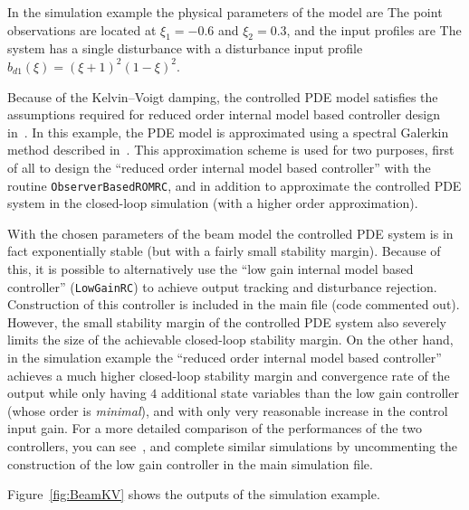 \documentclass[11pt, a4paper]{amsart}
\theoremstyle{definition}
\numberwithin{equation}{section}
\begin{document}
In the simulation example the physical parameters of the model are 
The point observations are located at $\xi_1=-0.6$ and $\xi_2=0.3$, and the input profiles are
The system has a
single disturbance with a disturbance input profile 
$b_{d1}(\xi) = (\xi+1)^2(1-\xi)^2$.


Because of the Kelvin--Voigt damping, the controlled PDE model satisfies the assumptions required for reduced order internal model based controller design in~\cite{PauPha20}.
In this example, the PDE model is approximated using a spectral Galerkin method described in~\cite{She95}. This approximation scheme is used for two purposes, first of all to design the ``reduced order internal model based controller'' with the routine \texttt{ObserverBasedROMRC}, and in addition to approximate the controlled PDE system in the closed-loop simulation (with a higher order approximation).

With the chosen parameters of the beam model the controlled PDE system is in fact exponentially stable (but with a fairly small stability margin). Because of this, it is possible to alternatively use the ``low gain internal model based controller'' (\texttt{LowGainRC}) to achieve output tracking and disturbance rejection. Construction of this controller is included in the main file (code commented out). However, the small stability margin of the controlled PDE system also severely limits the size of the achievable closed-loop stability margin. On the other hand, in the simulation example the ``reduced order internal model based controller'' achieves a much higher closed-loop stability margin and convergence rate of the output while only having $4$ additional state variables than the low gain controller (whose order is \emph{minimal}), and with only very reasonable increase in the control input gain. For a more detailed comparison of the performances of the two controllers, you can see~, and complete similar simulations by uncommenting the construction of the low gain controller in the main simulation file.



Figure~\ref{fig:BeamKV} shows the outputs of the simulation example.
\end{document}
